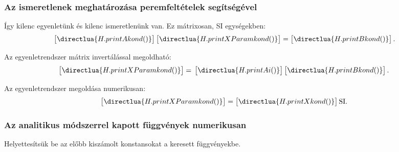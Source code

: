 \subsubsection{Az ismeretlenek meghatározása peremfeltételek segítségével}



Így kilenc egyenletünk és kilenc ismeretlenünk van. Ez mátrixosan,
SI egységekben:
\scriptsize
\begin{equation}
  \bgroup
  \sifigures{2}
  \sisci{}
  \begin{bmatrix}
    \directlua{H.printAkond()}
  \end{bmatrix}
  \egroup
  \begin{bmatrix}
    \directlua{H.printXParamkond()}
  \end{bmatrix}
  =
  \siplaces{3}
  \begin{bmatrix}
    \directlua{H.printBkond()}
  \end{bmatrix}
  \text.
  \label{eq:alma}
\end{equation}
\normalsize

Az egyenletrendszer mátrix invertálással megoldható:
\scriptsize
\begin{equation}
  \begin{bmatrix}
    \directlua{H.printXParamkond()}
  \end{bmatrix}
  =
  \bgroup
  \sifigures{2}
  \sisci{}
  \begin{bmatrix}
    \directlua{H.printAi()}
  \end{bmatrix}
  \egroup
  \siplaces{3}
  \begin{bmatrix}
    \directlua{H.printBkond()}
  \end{bmatrix}
  \label{eq:alma-inverted}
  \text.
\end{equation}
\normalsize

Az egyenletrendszer megoldása numerikusan:
\begin{equation}
  \begin{bmatrix}
    \directlua{H.printXParamkond()}
  \end{bmatrix}
  =
  \sifigures{6}
  \begin{bmatrix}
    \directlua{H.printXkond()}
  \end{bmatrix}
  \mathrm{SI}
  \text.
  \label{eq:alma-sol}
\end{equation}

\subsubsection{Az analitikus módszerrel kapott függvények numerikusan}

Helyettesítsük be az előbb kiszámolt konstansokat a keresett függvényekbe.





